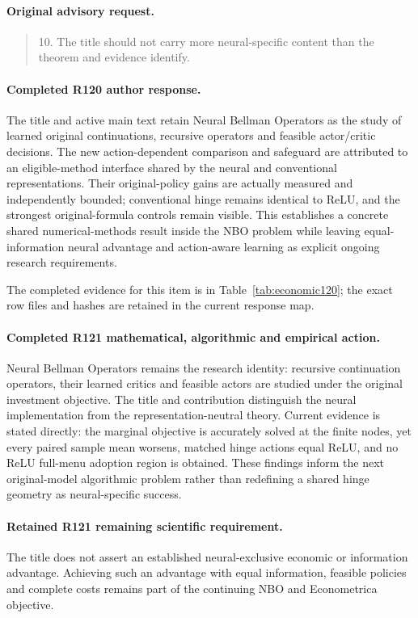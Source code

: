 \paragraph{Original advisory request.}
\begin{quote}
10. The title should not carry more neural-specific content than the theorem and evidence identify.
\end{quote}

\paragraph{Completed R120 author response.}
The title and active main text retain Neural Bellman Operators as the study of learned original continuations, recursive operators and feasible actor/critic decisions. The new action-dependent comparison and safeguard are attributed to an eligible-method interface shared by the neural and conventional representations. Their original-policy gains are actually measured and independently bounded; conventional hinge remains identical to ReLU, and the strongest original-formula controls remain visible. This establishes a concrete shared numerical-methods result inside the NBO problem while leaving equal-information neural advantage and action-aware learning as explicit ongoing research requirements.

The completed evidence for this item is in Table~\ref{tab:economic120}; the exact row files and hashes are retained in the current response map.

\paragraph{Completed R121 mathematical, algorithmic and empirical action.}
Neural Bellman Operators remains the research identity: recursive continuation operators, their learned critics and feasible actors are studied under the original investment objective. The title and contribution distinguish the neural implementation from the representation-neutral theory. Current evidence is stated directly: the marginal objective is accurately solved at the finite nodes, yet every paired sample mean worsens, matched hinge actions equal ReLU, and no ReLU full-menu adoption region is obtained. These findings inform the next original-model algorithmic problem rather than redefining a shared hinge geometry as neural-specific success.

\paragraph{Retained R121 remaining scientific requirement.}
The title does not assert an established neural-exclusive economic or information advantage. Achieving such an advantage with equal information, feasible policies and complete costs remains part of the continuing NBO and Econometrica objective.

